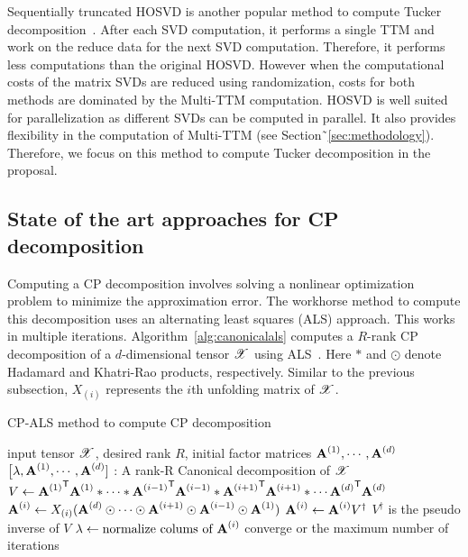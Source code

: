 \documentclass[a4paper,11pt]{article}
\newcommand{\X}{\T{X}}
\begin{document}
	
	Sequentially truncated HOSVD is another popular method to compute Tucker decomposition~\cite{VVM-SIAM-2012}. After each SVD computation, it performs a single TTM and work on the reduce data for the next SVD computation. Therefore, it performs less computations than the original HOSVD. However when the computational costs of the matrix SVDs are reduced using randomization, costs for both methods are dominated by the Multi-TTM computation. HOSVD is well suited for parallelization as different SVDs can be computed in parallel. It also provides flexibility in the computation of Multi-TTM (see Section˜\ref{sec:methodology}). Therefore, we focus on this method to compute Tucker decomposition in the proposal.		
	
	\subsection{State of the art approaches for CP decomposition}
	\label{sec:context:soa:Canonical}
	Computing a CP decomposition involves solving a nonlinear optimization problem to minimize the approximation error. The workhorse method to compute this decomposition uses an alternating least squares (ALS) approach. This works in multiple iterations. Algorithm~\ref{alg:canonicalals} computes a $R$-rank CP decomposition of a $d$-dimensional tensor $\X$ using ALS~\cite{KB-SIAM-2009}. Here $*$ and $\odot$ denote Hadamard and Khatri-Rao products, respectively. Similar to the previous subsection, $X_{(i)}$ represents the $i$th unfolding matrix of $\X$. 
	
	\begin{algorithm}[H]{
			\caption{CP-ALS method to compute CP decomposition\label{alg:canonicalals}}
			\begin{algorithmic}[1]
				\Require input tensor $\X$, desired rank $R$, initial factor matrices $\Mn{A}{1}, \cdots, \Mn{A}{d}$
				\Ensure $\big[\lambda, \Mn{A}{1}, \cdots, \Mn{A}{d}]$ : A rank-R Canonical decomposition of $\X$
				\Repeat
				\label{method:canonical:oneiter:start}
				\State $V\gets{\Mn{A}{1}}^\Tra{\Mn{A}{1}}*\cdots*{\Mn{A}{i-1}}^\Tra{\Mn{A}{i-1}}*{\Mn{A}{i+1}}^\Tra{\Mn{A}{i+1}}*\cdots{\Mn{A}{d}}^\Tra{\Mn{A}{d}}$
				\State ${\Mn{A}{i}}\gets X_{(i)} ({\Mn{A}{d}}\odot\cdots\odot{\Mn{A}{i+1}}\odot{\Mn{A}{i-1}}\odot {\Mn{A}{1}})$\label{alg:canonicalals:mttkrp}
				\State ${\Mn{A}{i}}\gets {\Mn{A}{i}}V^\dagger$ \Comment $V^\dagger$ is the pseudo inverse of $V$
				\State $\lambda\gets \text{normalize colums of }{\Mn{A}{i}}$ 
				\EndFor\label{method:canonical:oneiter:end}
				\Until converge or the maximum number of iterations
			\end{algorithmic}
	}\end{algorithm}
	
\end{document}

